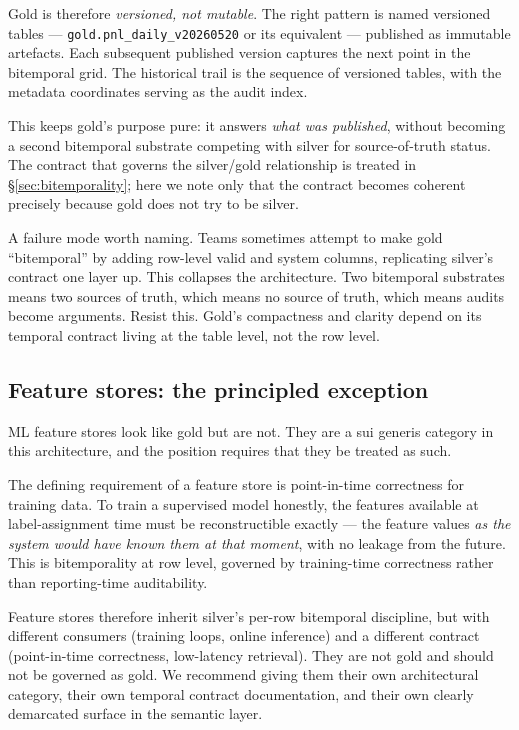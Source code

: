 \documentclass[11pt,a4paper]{article}
\begin{document}
Gold is therefore \emph{versioned, not mutable}. The right pattern is named versioned tables --- \texttt{gold.pnl\_daily\_v20260520} or its equivalent --- published as immutable artefacts. Each subsequent published version captures the next point in the bitemporal grid. The historical trail is the sequence of versioned tables, with the metadata coordinates serving as the audit index.

This keeps gold's purpose pure: it answers \emph{what was published}, without becoming a second bitemporal substrate competing with silver for source-of-truth status. The contract that governs the silver/gold relationship is treated in \S\ref{sec:bitemporality}; here we note only that the contract becomes coherent precisely because gold does not try to be silver.

A failure mode worth naming. Teams sometimes attempt to make gold ``bitemporal'' by adding row-level valid and system columns, replicating silver's contract one layer up. This collapses the architecture. Two bitemporal substrates means two sources of truth, which means no source of truth, which means audits become arguments. Resist this. Gold's compactness and clarity depend on its temporal contract living at the table level, not the row level.

\subsection{Feature stores: the principled exception}

ML feature stores look like gold but are not. They are a sui generis category in this architecture, and the position requires that they be treated as such.

The defining requirement of a feature store is point-in-time correctness for training data. To train a supervised model honestly, the features available at label-assignment time must be reconstructible exactly --- the feature values \emph{as the system would have known them at that moment}, with no leakage from the future. This is bitemporality at row level, governed by training-time correctness rather than reporting-time auditability.

Feature stores therefore inherit silver's per-row bitemporal discipline, but with different consumers (training loops, online inference) and a different contract (point-in-time correctness, low-latency retrieval). They are not gold and should not be governed as gold. We recommend giving them their own architectural category, their own temporal contract documentation, and their own clearly demarcated surface in the semantic layer.
\end{document}
